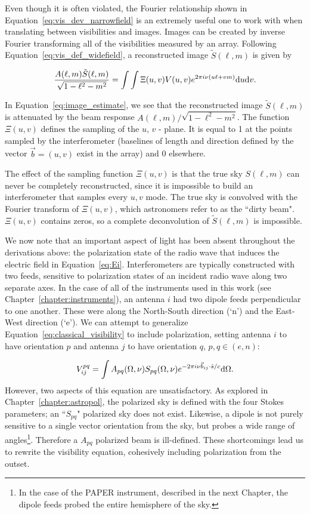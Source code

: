 Even though it is often violated, the Fourier relationship shown in Equation~\ref{eq:vis_dev_narrowfield} is an extremely useful one to work with when translating between visibilities and images. Images can be created by inverse Fourier transforming all of the visibilities measured by an array. Following Equation~\ref{eq:vis_def_widefield}, a reconstructed image $\tilde{S}(\ell, m)$ is given by

\begin{equation}
\frac{A(\ell, m)\tilde{S}(\ell, m)}{\sqrt{1 - \ell^2 - m^2}} = \int\int \Xi(u, v) V(u,v) e^{2\pi i \nu (u\ell + vm)} {\rm d}u {\rm d}v.
\label{eq:image_estimate}
\end{equation}

In Equation~\ref{eq:image_estimate}, we see that the reconstructed image $\tilde{S}(\ell, m)$ is attenuated by the beam response $A(\ell, m)/\sqrt{1 - \ell^2 - m^2}$. The function $\Xi(u, v)$ defines the sampling of the $u,\,v$ - plane. It is equal to 1 at the points sampled by the interferometer (baselines of length and direction defined by the vector  $\vec{b} = (u,v)$ exist in the array) and 0 elsewhere.

The effect of the sampling function $\Xi(u, v)$ is that the true sky $S(\ell,m)$ can never be completely reconstructed, since it is impossible to build an interferometer that samples every $u,v$ mode. The true sky is convolved with the Fourier transform of $\Xi(u, v)$, which astronomers refer to as the ``dirty beam". $\Xi(u, v)$ contains zeros, so a complete deconvolution of $\tilde{S}(\ell, m)$ is impossible.

We now note that an important aspect of light has been absent throughout the derivations above: the polarization state of the radio wave that induces the electric field in Equation~\ref{eq:Ei}. Interferometers are typically constructed with two feeds, sensitive to polarization states of an incident radio wave along two separate axes. In the case of all of the instruments used in this work (see Chapter~\ref{chapter:instruments}), an antenna $i$ had two dipole feeds perpendicular to one another. These were along the North-South direction (`n') and the East-West direction (`e'). We can attempt to generalize Equation~\ref{eq:classical_visibility} to include polarization, setting antenna $i$ to have orientation $p$ and antenna $j$ to have orientation $q$, $p,q\in(e,n)$:

\begin{equation}
V^{pq}_{ij} = \int A_{pq}(\Omega, \nu) S_{pq}(\Omega, \nu) e^{-2\pi i \nu \vec{b}_{ij}\cdot\hat{s}/c} {\rm d}\Omega.
\end{equation} 
However, two aspects of this equation are unsatisfactory. As explored in Chapter~\ref{chapter:astropol}, the polarized sky is defined with the four Stokes parameters; an ``$S_{pq}$" polarized sky does not exist. Likewise, a dipole is not purely sensitive to a single vector orientation from the sky, but probes a wide range of angles\footnote{In the case of the PAPER instrument, described in the next Chapter, the dipole feeds probed the entire hemisphere of the sky.}. Therefore a $A_{pq}$ polarized beam is ill-defined. These shortcomings lead us to rewrite the visibility equation, cohesively including polarization from the outset.  

